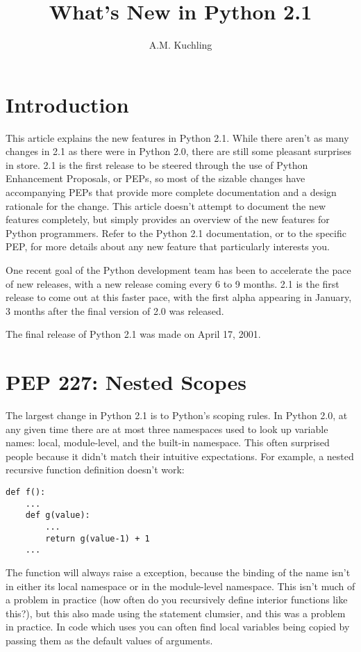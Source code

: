 \documentclass{howto}
\title{What's New in Python 2.1}
\author{A.M. Kuchling}
\begin{document}
\maketitle\tableofcontents

\section{Introduction}

This article explains the new features in Python 2.1.  While there aren't as
many changes in 2.1 as there were in Python 2.0, there are still some
pleasant surprises in store.  2.1 is the first release to be steered
through the use of Python Enhancement Proposals, or PEPs, so most of
the sizable changes have accompanying PEPs that provide more complete
documentation and a design rationale for the change.  This article
doesn't attempt to document the new features completely, but simply
provides an overview of the new features for Python programmers.
Refer to the Python 2.1 documentation, or to the specific PEP, for
more details about any new feature that particularly interests you.

One recent goal of the Python development team has been to accelerate
the pace of new releases, with a new release coming every 6 to 9
months. 2.1 is the first release to come out at this faster pace, with
the first alpha appearing in January, 3 months after the final version
of 2.0 was released.

The final release of Python 2.1 was made on April 17, 2001.

\section{PEP 227: Nested Scopes}

The largest change in Python 2.1 is to Python's scoping rules.  In
Python 2.0, at any given time there are at most three namespaces used
to look up variable names: local, module-level, and the built-in
namespace.  This often surprised people because it didn't match their
intuitive expectations.  For example, a nested recursive function
definition doesn't work:

\begin{verbatim}
def f():
    ...
    def g(value):
        ...
        return g(value-1) + 1
    ...
\end{verbatim}

The function  will always raise a 
exception, because the binding of the name  isn't in either
its local namespace or in the module-level namespace.  This isn't much
of a problem in practice (how often do you recursively define interior
functions like this?), but this also made using the 
statement clumsier, and this was a problem in practice.  In code which
uses  you can often find local variables being copied
by passing them as the default values of arguments.
\end{document}
